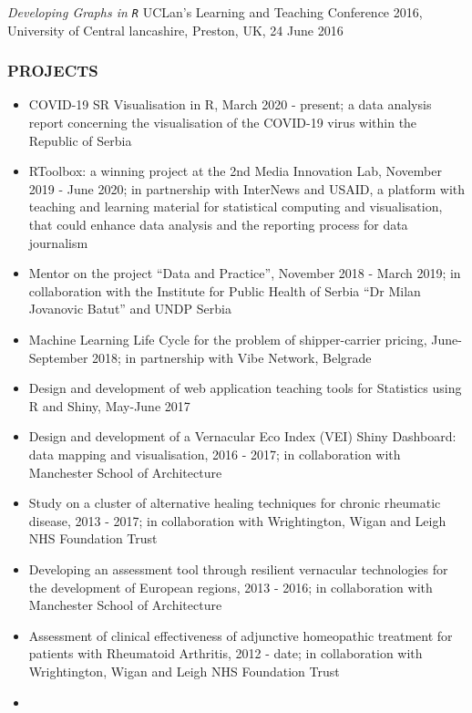 \documentclass[
]{article}
\begin{document}
\emph{Developing Graphs in \texttt{R}} UCLan's Learning and Teaching
Conference 2016, University of Central lancashire, Preston, UK, 24 June
2016

\hypertarget{projects}{%
\subsubsection{PROJECTS}\label{projects}}

\begin{itemize}
\item
  COVID-19 SR Visualisation in R, March 2020 - present; a data analysis
  report concerning the visualisation of the COVID-19 virus within the
  Republic of Serbia
\item
  RToolbox: a winning project at the 2nd Media Innovation Lab, November
  2019 - June 2020; in partnership with InterNews and USAID, a platform
  with teaching and learning material for statistical computing and
  visualisation, that could enhance data analysis and the reporting
  process for data journalism
\item
  Mentor on the project ``Data and Practice'', November 2018 - March
  2019; in collaboration with the Institute for Public Health of Serbia
  ``Dr Milan Jovanovic Batut'' and UNDP Serbia
\item
  Machine Learning Life Cycle for the problem of shipper-carrier
  pricing, June-September 2018; in partnership with Vibe Network,
  Belgrade
\item
  Design and development of web application teaching tools for
  Statistics using R and Shiny, May-June 2017
\item
  Design and development of a Vernacular Eco Index (VEI) Shiny
  Dashboard: data mapping and visualisation, 2016 - 2017; in
  collaboration with Manchester School of Architecture
\item
  Study on a cluster of alternative healing techniques for chronic
  rheumatic disease, 2013 - 2017; in collaboration with Wrightington,
  Wigan and Leigh NHS Foundation Trust
\item
  Developing an assessment tool through resilient vernacular
  technologies for the development of European regions, 2013 - 2016; in
  collaboration with Manchester School of Architecture
\item
  Assessment of clinical effectiveness of adjunctive homeopathic
  treatment for patients with Rheumatoid Arthritis, 2012 - date; in
  collaboration with Wrightington, Wigan and Leigh NHS Foundation Trust
\item

\end{itemize}
\end{document}
